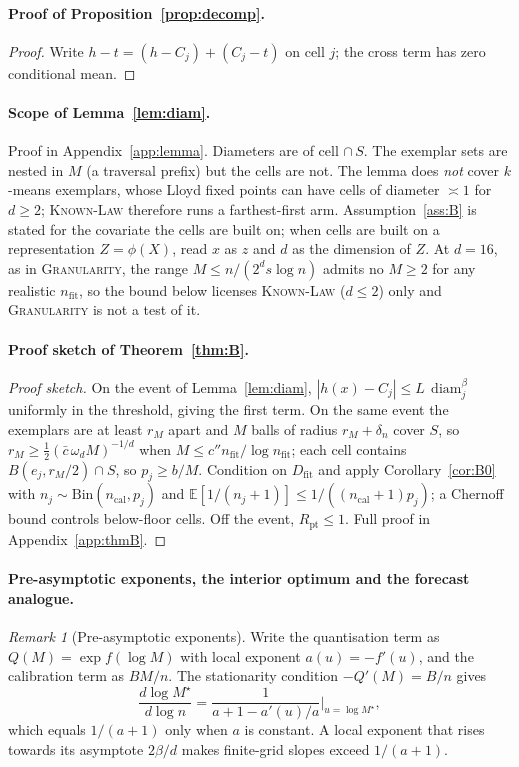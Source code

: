 \documentclass[11pt]{article}
\theoremstyle{definition}
\theoremstyle{remark}
\newtheorem{remark}[theorem]{Remark}
\newcommand{\Dfit}{D_{\mathrm{fit}}}
\newcommand{\E}{\mathbb{E}}
\newcommand{\1}{\mathbf{1}}
\DeclareMathOperator{\diam}{diam}
\newcommand{\expname}[1]{\textsc{#1}}
\begin{document}
\paragraph{Proof of Proposition~\ref{prop:decomp}.}
\begin{proof}
Write $h-t=(h-C_j)+(C_j-t)$ on cell $j$; the cross term has zero conditional mean.
\end{proof}

\paragraph{Scope of Lemma~\ref{lem:diam}.}
Proof in Appendix~\ref{app:lemma}. Diameters are of cell $\cap\,S$. The exemplar sets are nested in
$M$ (a traversal prefix) but the cells are not. The lemma does \emph{not} cover $k$-means exemplars,
whose Lloyd fixed points can have cells of diameter $\asymp1$ for $d\ge2$; \expname{Known-Law} therefore runs a
farthest-first arm. Assumption~\ref{ass:B} is stated for the covariate the cells are built on; when
cells are built on a representation $Z=\phi(X)$, read $x$ as $z$ and $d$ as the dimension of $Z$. At
$d=16$, as in \expname{Granularity}, the range $M\le n/(2^ds\log n)$ admits no $M\ge2$ for any realistic $n_{\mathrm{fit}}$, so
the bound below licenses \expname{Known-Law} ($d\le2$) only and \expname{Granularity} is not a test of it.

\paragraph{Proof sketch of Theorem~\ref{thm:B}.}
\begin{proof}[Proof sketch]
On the event of Lemma~\ref{lem:diam}, $|h(x)-C_j|\le L\,\diam_j^\beta$ uniformly in the threshold,
giving the first term. On the same event the exemplars are at least $r_M$ apart and $M$ balls of
radius $r_M+\delta_n$ cover $S$, so $r_M\ge\tfrac12(\bar c\,\omega_d M)^{-1/d}$ when $M\le c''n_{\mathrm{fit}}/\log n_{\mathrm{fit}}$;
each cell contains $B(e_j,r_M/2)\cap S$, so $p_j\ge b/M$. Condition on $\Dfit$ and apply Corollary~\ref{cor:B0} with
$n_j\sim\mathrm{Bin}(n_{\mathrm{cal}},p_j)$ and $\E[1/(n_j+1)]\le1/((n_{\mathrm{cal}}+1)p_j)$; a Chernoff
bound controls below-floor cells. Off the event, $R_{\mathrm{pt}}\le1$. Full proof in
Appendix~\ref{app:thmB}.
\end{proof}

\paragraph{Pre-asymptotic exponents, the interior optimum and the forecast analogue.}
\begin{remark}[Pre-asymptotic exponents]
\label{rem:drift}
Write the quantisation term as $Q(M)=\exp f(\log M)$ with local exponent $a(u)=-f'(u)$, and
the calibration term as $BM/n$. The stationarity condition $-Q'(M)=B/n$ gives
\[
  \frac{d\log M^\star}{d\log n} = \frac{1}{a+1-a'(u)/a}\Big|_{u=\log M^\star},
\]
which equals $1/(a+1)$ only when $a$ is constant. A local exponent that rises towards its
asymptote $2\beta/d$ makes finite-grid slopes exceed $1/(a+1)$.
\end{remark}
\end{document}
